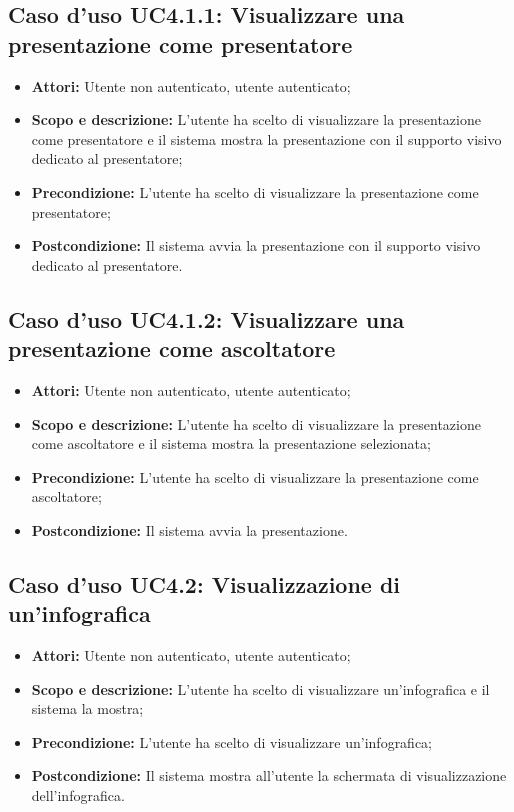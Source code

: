 \subsection{Caso d'uso UC4.1.1: Visualizzare una presentazione come presentatore}
\begin{itemize}
	\item \textbf{Attori:} Utente non autenticato, utente autenticato;
	\item \textbf{Scopo e descrizione:} L'utente ha scelto di visualizzare la presentazione come presentatore e il sistema mostra la presentazione con il supporto visivo dedicato al presentatore;
	\item \textbf{Precondizione:} L'utente ha scelto di visualizzare la presentazione come presentatore;
	\item \textbf{Postcondizione:} Il sistema avvia la presentazione con il supporto visivo dedicato al presentatore.
\end{itemize}

\subsection{Caso d'uso UC4.1.2: Visualizzare una presentazione come ascoltatore}
\begin{itemize}
	\item \textbf{Attori:} Utente non autenticato, utente autenticato;
	\item \textbf{Scopo e descrizione:} L'utente ha scelto di visualizzare la presentazione come ascoltatore e il sistema mostra la presentazione selezionata;
	\item \textbf{Precondizione:} L'utente ha scelto di visualizzare la presentazione come ascoltatore;
	\item \textbf{Postcondizione:} Il sistema avvia la presentazione.
\end{itemize}

\subsection{Caso d'uso UC4.2: Visualizzazione di un'infografica}
\begin{itemize}
	\item \textbf{Attori:} Utente non autenticato, utente autenticato;
	\item \textbf{Scopo e descrizione:} L'utente ha scelto di visualizzare un'infografica e il sistema la mostra;
	\item \textbf{Precondizione:} L'utente ha scelto di visualizzare un'infografica;
	\item \textbf{Postcondizione:} Il sistema mostra all'utente la schermata di visualizzazione dell'infografica.
\end{itemize}